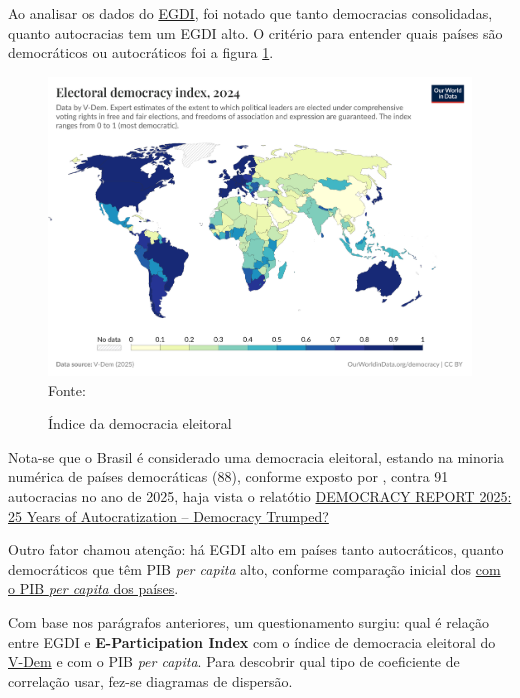 Ao analisar os dados do \href{https://publicadministration.un.org/egovkb/en-us/About/Overview/-E-Government-Development-Index}{EGDI}, foi notado que tanto democracias consolidadas, quanto autocracias tem um EGDI alto. O critério para entender quais países são democráticos ou autocráticos foi a figura \ref{fig:electoral-democracy-index}. 

\begin{figure}[ht]
	\centering
	\caption{Índice da democracia eleitoral}
	\includegraphics[width=1\linewidth]{figuras/democracia/electoral-democracy-index.png}
	\label{fig:electoral-democracy-index}
	\footnotesize{Fonte: \cite{electoral_democracy_index}}
\end{figure}

Nota-se que o Brasil é considerado uma democracia eleitoral, estando na minoria numérica de países democráticas (88), conforme exposto por \cite{nord2025democracy}, contra 91 autocracias no ano de 2025, haja vista o relatótio \href{https://www.v-dem.net/documents/60/V-dem-dr__2025_lowres.pdf}{DEMOCRACY REPORT 2025: 25 Years of Autocratization – Democracy Trumped?}

Outro fator chamou atenção: há EGDI alto em países tanto autocráticos, quanto democráticos que têm PIB \textit{per capita} alto, conforme comparação inicial dos \href{https://data.worldbank.org/indicator/NY.GDP.PCAP.PP.KD}{com o PIB \textit{per capita} dos países}. 

Com base nos parágrafos anteriores, um questionamento surgiu: qual é relação entre EGDI e \textbf{E-Participation Index} com o índice de democracia eleitoral do \href{https://www.v-dem.net/}{V-Dem} e com o PIB \textit{per capita}. Para descobrir qual tipo de coeficiente de correlação usar, fez-se diagramas de dispersão.


